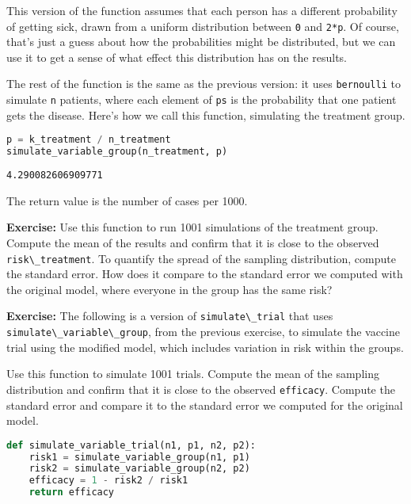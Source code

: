 This version of the function assumes that each person has a different
probability of getting sick, drawn from a uniform distribution between
\passthrough{\lstinline!0!} and \passthrough{\lstinline!2*p!}. Of
course, that's just a guess about how the probabilities might be
distributed, but we can use it to get a sense of what effect this
distribution has on the results.

The rest of the function is the same as the previous version: it uses
\passthrough{\lstinline!bernoulli!} to simulate
\passthrough{\lstinline!n!} patients, where each element of
\passthrough{\lstinline!ps!} is the probability that one patient gets
the disease. Here's how we call this function, simulating the treatment
group.

\begin{lstlisting}[language=Python,style=source]
p = k_treatment / n_treatment
simulate_variable_group(n_treatment, p)
\end{lstlisting}

\begin{lstlisting}[style=output]
4.290082606909771
\end{lstlisting}

The return value is the number of cases per 1000.

\textbf{Exercise:} Use this function to run 1001 simulations of the
treatment group. Compute the mean of the results and confirm that it is
close to the observed \passthrough{\lstinline!risk\_treatment!}. To
quantify the spread of the sampling distribution, compute the standard
error. How does it compare to the standard error we computed with the
original model, where everyone in the group has the same risk?

\textbf{Exercise:} The following is a version of
\passthrough{\lstinline!simulate\_trial!} that uses
\passthrough{\lstinline!simulate\_variable\_group!}, from the previous
exercise, to simulate the vaccine trial using the modified model, which
includes variation in risk within the groups.

Use this function to simulate 1001 trials. Compute the mean of the
sampling distribution and confirm that it is close to the observed
\passthrough{\lstinline!efficacy!}. Compute the standard error and
compare it to the standard error we computed for the original model.

\begin{lstlisting}[language=Python,style=source]
def simulate_variable_trial(n1, p1, n2, p2):
    risk1 = simulate_variable_group(n1, p1)
    risk2 = simulate_variable_group(n2, p2)
    efficacy = 1 - risk2 / risk1
    return efficacy
\end{lstlisting}

